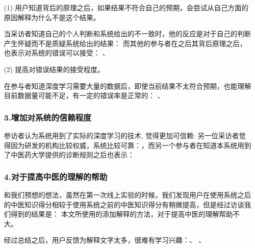 (1) 用户知道背后的原理之后，如果结果不符合自己的预期，会尝试从自己方面的原因解释为什么不是这个结果。

当采访者知道自己的个人判断和系统给出的不一致时，他的反应是对于自己的判断产生怀疑而不是质疑系统给出的结果： 而其他的参与者在之后其背后原理之后，也表示对系统的错误可以接受：
、


(2) 提高对错误结果的接受程度。

在参与者知道深度学习需要大量的数据后，即使当前结果不太符合预期，也能理解目前数据量可能不足，有一定的错误率是正常的：
、

\subsubsection{3.增加对系统的信赖程度}

参访者认为系统用到了实际的深度学习的技术, 觉得更加可信赖:
另一位采访者觉得因为研发的机构比较权威，系统比较可靠：，而另一个参与者在知道本系统用到了中医药大学提供的诊断规则之后也表示：

\subsubsection{4.对于提高中医的理解的帮助}
和我们预想的想法，虽然在第一次线上实验的时候，我们发现用户在使用系统之后的中医知识得分相较于使用系统之前的中医知识得分有稍微提高，但是经过访谈我们得到的结果是：
本文所使用的添加解释的方法，对于提高中医的理解帮助不大。

经过总结之后，用户反馈为解释文字太多，很难有学习兴趣：、
、



